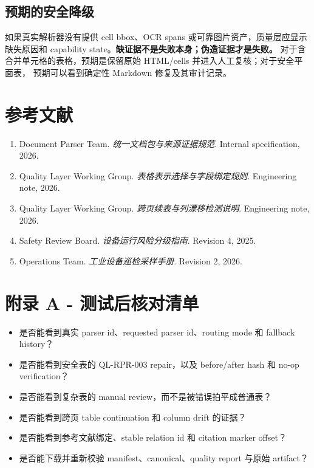 \documentclass[UTF8,a4paper,11pt]{ctexart}
\newcommand{\risk}[1]{\textcolor{warn}{\textbf{#1}}}
\begin{document}
\subsection{预期的安全降级}

如果真实解析器没有提供 cell bbox、OCR spans 或可靠图片资产，质量层应显示
缺失原因和 capability state。\risk{缺证据不是失败本身；伪造证据才是失败。}
对于含合并单元格的表格，预期是保留原始 HTML/cells 并进入人工复核；对于安全平面表，
预期可以看到确定性 Markdown 修复及其审计记录。

\section{参考文献}

\begin{enumerate}[leftmargin=2.4em]
  \item[1] Document Parser Team. \textit{统一文档包与来源证据规范}. Internal specification, 2026.
  \item[2] Quality Layer Working Group. \textit{表格表示选择与字段绑定规则}. Engineering note, 2026.
  \item[3] Quality Layer Working Group. \textit{跨页续表与列漂移检测说明}. Engineering note, 2026.
  \item[4] Safety Review Board. \textit{设备运行风险分级指南}. Revision 4, 2025.
  \item[5] Operations Team. \textit{工业设备巡检采样手册}. Revision 2, 2026.
\end{enumerate}

\section*{附录 A - 测试后核对清单}

\begin{itemize}[leftmargin=2em]
  \item 是否能看到真实 parser id、requested parser id、routing mode 和 fallback history？
  \item 是否能看到安全表的 QL-RPR-003 repair，以及 before/after hash 和 no-op verification？
  \item 是否能看到复杂表的 manual review，而不是被错误拍平成普通表？
  \item 是否能看到跨页 table continuation 和 column drift 的证据？
  \item 是否能看到参考文献绑定、stable relation id 和 citation marker offset？
  \item 是否能下载并重新校验 manifest、canonical、quality report 与原始 artifact？
\end{itemize}
\end{document}
